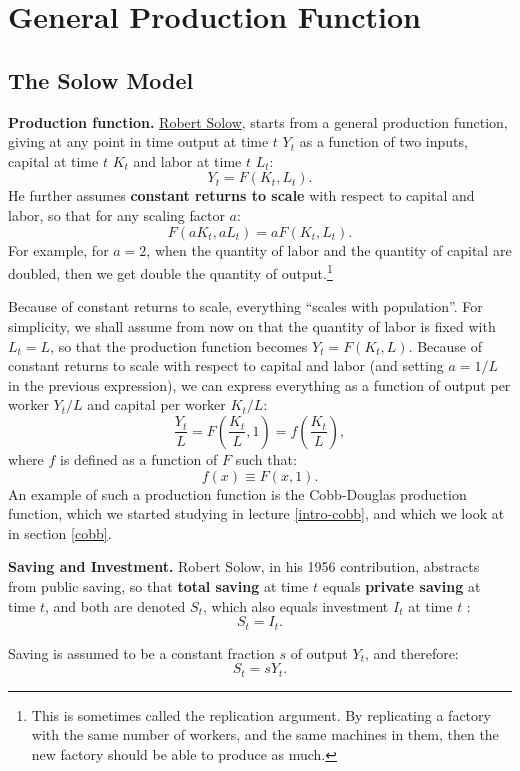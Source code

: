 \documentclass[]{book}
\let\rmarkdownfootnote\footnote%
\def\footnote{\protect\rmarkdownfootnote}
\theoremstyle{definition}
\theoremstyle{definition}
\theoremstyle{definition}
\theoremstyle{remark}
\begin{document}
\section{General Production Function}\label{general-production-f}

\subsection{The Solow Model}\label{the-solow-model}

\textbf{Production function.}
\href{https://en.wikipedia.org/wiki/Robert_Solow}{Robert Solow}, starts
from a general production function, giving at any point in time output
at time \(t\) \(Y_t\) as a function of two inputs, capital at time \(t\)
\(K_t\) and labor at time \(t\) \(L_t\): \[Y_t=F\left(K_t,L_t\right).\]
He further assumes \textbf{constant returns to scale} with respect to
capital and labor, so that for any scaling factor \(a\):
\[F(aK_t, aL_t) = aF(K_t, L_t).\] For example, for \(a=2\), when the
quantity of labor and the quantity of capital are doubled, then we get
double the quantity of output.\footnote{This is sometimes called the
  replication argument. By replicating a factory with the same number of
  workers, and the same machines in them, then the new factory should be
  able to produce as much.}

Because of constant returns to scale, everything ``scales with
population''. For simplicity, we shall assume from now on that the
quantity of labor is fixed with \(L_t=L\), so that the production
function becomes \(Y_t=F(K_t, L)\). Because of constant returns to scale
with respect to capital and labor (and setting \(a=1/L\) in the previous
expression), we can express everything as a function of output per
worker \(Y_t/L\) and capital per worker \(K_t/L\):
\[\frac{Y_t}{L}=F\left(\frac{K_t}{L},1\right)=f\left(\frac{K_t}{L}\right),\]
where \(f\) is defined as a function of \(F\) such that:
\[f(x)\equiv F(x,1).\] An example of such a production function is the
Cobb-Douglas production function, which we started studying in lecture
\ref{intro-cobb}, and which we look at in section \ref{cobb}.

\textbf{Saving and Investment.} Robert Solow, in his 1956 contribution,
abstracts from public saving, so that \textbf{total saving} at time
\(t\) equals \textbf{private saving} at time \(t\), and both are denoted
\(S_{t}\), which also equals investment \(I_{t}\) at time \(t\) :
\[S_{t}=I_{t}.\]

Saving is assumed to be a constant fraction \(s\) of output \(Y_{t}\),
and therefore: \[S_{t}=sY_{t}.\]
\end{document}
